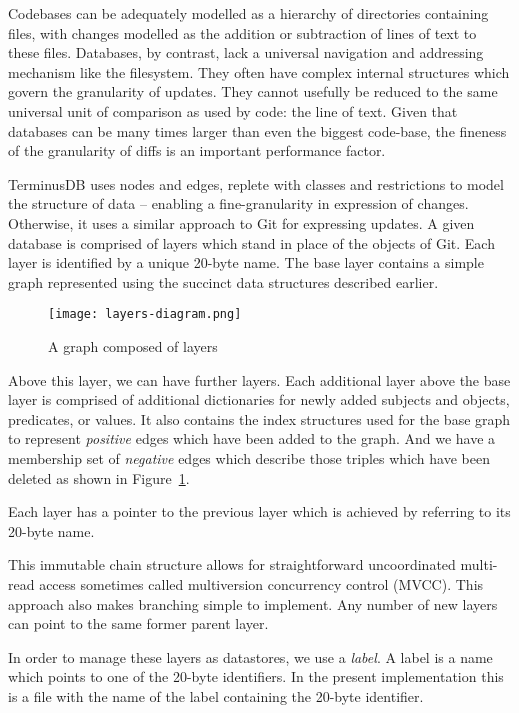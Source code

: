 \documentclass[10pt, a4paper, twocolumn]{article} %
\begin{document}
Codebases can be adequately modelled as a hierarchy of directories
containing files, with changes modelled as the addition or subtraction
of lines of text to these files. Databases, by contrast, lack a
universal navigation and addressing mechanism like the filesystem.
They often have complex internal structures which govern the
granularity of updates. They cannot usefully be reduced to the same
universal unit of comparison as used by code: the line of text. Given
that databases can be many times larger than even the biggest
code-base, the fineness of the granularity of diffs is an important
performance factor.

TerminusDB uses nodes and edges, replete with classes and restrictions
to model the structure of data – enabling a fine-granularity in
expression of changes. Otherwise, it uses a similar approach to Git for
expressing updates. A given database is comprised of layers which
stand in place of the objects of Git. Each layer is identified by a
unique 20-byte name. The base layer contains a simple graph
represented using the succinct data structures described earlier.

\begin{figure}
	\texttt{[image: layers-diagram.png]} %
	\caption{A graph composed of layers} %
	\label{fig:layers} %
\end{figure}

Above this layer, we can have further layers. Each additional layer
above the base layer is comprised of additional dictionaries for newly
added subjects and objects, predicates, or values. It also contains the
index structures used for the base graph to represent {\em positive}
edges which have been added to the graph. And we have a membership set
of {\em negative} edges which describe those triples which have been
deleted as shown in Figure~\ref{fig:layers}.

Each layer has a pointer to the previous layer which is achieved by
referring to its 20-byte name.

This immutable chain structure allows for straightforward uncoordinated
multi-read access sometimes called multiversion concurrency control
(MVCC)\autocite{Mohan:1992:EFM:130283.130306}\autocite{Sadoghi:2014:RDL:2733004.2733006}. This
approach also makes branching simple to implement. Any number of new
layers can point to the same former parent layer.

In order to manage these layers as datastores, we use a {\em label}. A
label is a name which points to one of the 20-byte identifiers. In the
present implementation this is a file with the name of the label
containing the 20-byte identifier.
\end{document}
